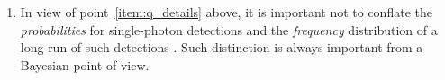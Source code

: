 \documentclass[\ifafour a4paper,12pt,\else a5paper,10pt,\fi%
onecolumn,oneside,article,%
british%
]{memoir}
\newcommand*{\defquote}[1]{`\,#1\,'}
\theoremstyle{remark}
\theoremstyle{innote}
\newcommand*{\citep}{\parencites}%
\newcommand*{\ibid}{\unspace\addtocounter{footnote}{-1}\footnotemark{}}
\newcommand*{\amp}{\&}
\renewcommand*{\|}[1][]{\nonscript\,#1\vert\nonscript\;\mathopen{}}
\newcommand*{\sect}{\S}%
\newcommand*{\eqn}{eq.}%
\newcommand*{\eg}{{e.g.}}
\begin{document}
\begin{enumerate}[label=(\textbf{\roman*})]
\item\label{item:q_prob_freq} In view of point~\ref{item:q_details} above,
  it is important not to conflate the \emph{probabilities} for
  single-photon detections and the \emph{frequency} distribution of a
  long-run of such detections \citep[\sect~2, seem to conflate the
  two]{gelmanetal2020}. Such distinction is always important from a
  Bayesian point of view.
%  


%
\end{enumerate}
\end{document}
